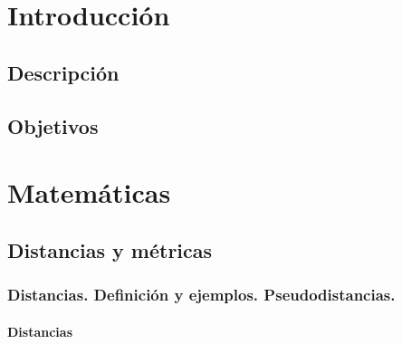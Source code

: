 \documentclass[ oneside,openany,titlepage,numbers=noenddot,headinclude,%
                footinclude=true,cleardoublepage=empty,abstractoff, %
                BCOR=5mm,paper=a4,fontsize=11pt,%
                spanish,american%
                ]{scrreprt}
\begin{document}
\frenchspacing
\raggedbottom
{} %
\pagestyle{plain}
%
%
%
\pagestyle{scrheadings}
\cleardoublepage{}
\cleardoublepage

\part{Introducción}

\chapter{Descripción}
%

\chapter{Objetivos}
%

\part{Matemáticas}

\chapter{Distancias y métricas}

\section{Distancias. Definición y ejemplos. Pseudodistancias.}

\subsection{Distancias}
\end{document}
